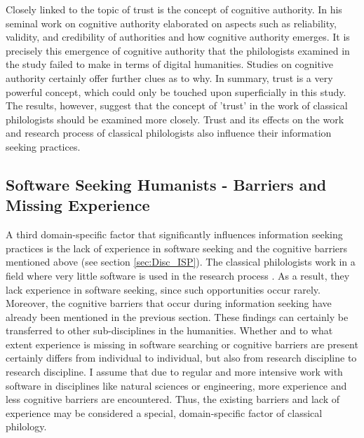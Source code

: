 \documentclass[12pt, a4paper, titlepage, oneside, abstract=true, toc=listof, toc=bibliography, BCOR=1cm]{scrreprt}
\begin{document}
{%
Closely linked to the topic of trust is the concept of cognitive authority. In his seminal work on cognitive authority \citet{Wilson1983} elaborated on aspects such as reliability, validity, and credibility of authorities and how cognitive authority emerges. It is precisely this emergence of cognitive authority that the philologists examined in the study failed to make in terms of digital humanities. Studies on cognitive authority certainly offer further clues as to why. In summary, trust is a very powerful concept, which could only be touched upon superficially in this study. The results, however, suggest that the concept of 'trust' in the work of classical philologists should be examined more closely. Trust and its effects on the work and research process of classical philologists also influence their information seeking practices. 

\subsection*{Software Seeking Humanists - Barriers and Missing Experience}
A third domain-specific factor that significantly influences information seeking practices is the lack of experience in software seeking and the cognitive barriers \citep{Savolainen2015a} mentioned above (see section \ref{sec:Disc_ISP}). The classical philologists work in a field where very little software is used in the research process \citep[p. 808]{Given2018}. As a result, they lack experience in software seeking, since such opportunities occur rarely. Moreover, the cognitive barriers that occur during information seeking have already been mentioned in the previous section. These findings can certainly be transferred to other sub-disciplines in the humanities. Whether and to what extent experience is missing in software searching or cognitive barriers are present certainly differs from individual to individual, but also from research discipline to research discipline. I assume that due to regular and more intensive work with software in disciplines like natural sciences or engineering, more experience and less cognitive barriers are encountered. Thus, the existing barriers and lack of experience may be considered a special, domain-specific factor of classical philology.

}
\end{document}
